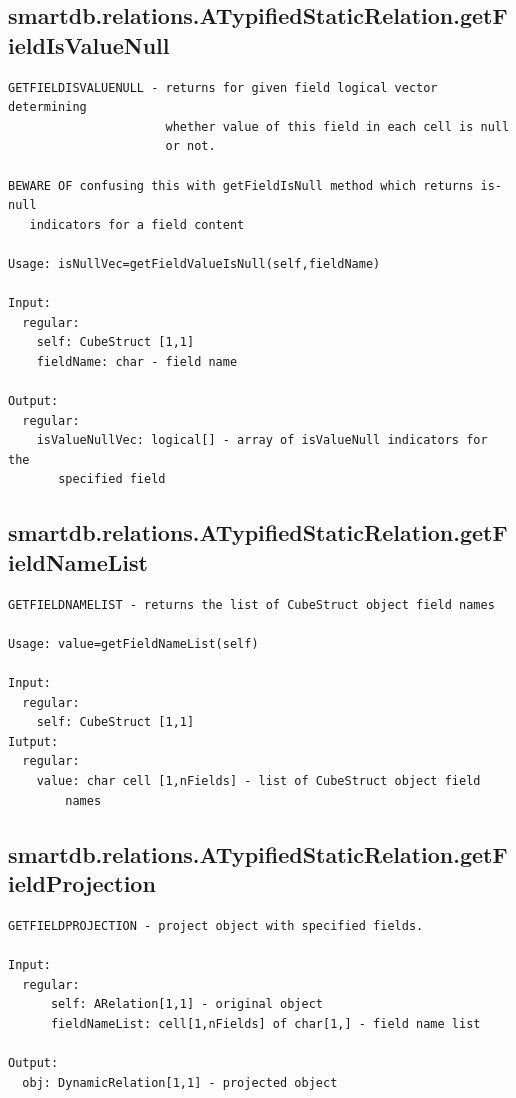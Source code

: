 \documentclass[letterpaper,10pt,english]{sphinxmanual}
\begin{document}
\subsection{smartdb.relations.ATypifiedStaticRelation.getFieldIsValueNull}
\label{chap_functions:smartdb-relations-atypifiedstaticrelation-getfieldisvaluenull}
\begin{Verbatim}[commandchars=\\\{\}]
GETFIELDISVALUENULL - returns for given field logical vector determining
                      whether value of this field in each cell is null
                      or not.

BEWARE OF confusing this with getFieldIsNull method which returns is-null
   indicators for a field content

Usage: isNullVec=getFieldValueIsNull(self,fieldName)

Input:
  regular:
    self: CubeStruct [1,1]
    fieldName: char - field name

Output:
  regular:
    isValueNullVec: logical[] - array of isValueNull indicators for the
       specified field
\end{Verbatim}


\subsection{smartdb.relations.ATypifiedStaticRelation.getFieldNameList}
\label{chap_functions:smartdb-relations-atypifiedstaticrelation-getfieldnamelist}
\begin{Verbatim}[commandchars=\\\{\}]
GETFIELDNAMELIST - returns the list of CubeStruct object field names

Usage: value=getFieldNameList(self)

Input:
  regular:
    self: CubeStruct [1,1]
Iutput:
  regular:
    value: char cell [1,nFields] - list of CubeStruct object field
        names
\end{Verbatim}


\subsection{smartdb.relations.ATypifiedStaticRelation.getFieldProjection}
\label{chap_functions:smartdb-relations-atypifiedstaticrelation-getfieldprojection}
\begin{Verbatim}[commandchars=\\\{\}]
GETFIELDPROJECTION - project object with specified fields.

Input:
  regular:
      self: ARelation[1,1] - original object
      fieldNameList: cell[1,nFields] of char[1,] - field name list

Output:
  obj: DynamicRelation[1,1] - projected object
\end{Verbatim}
\end{document}
